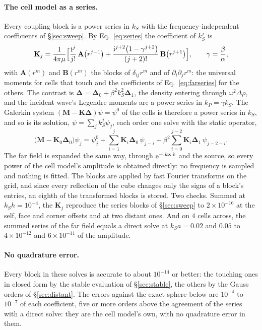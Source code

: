 \documentclass[11pt,a4paper]{article}
\newcommand{\bK}{\mathbf{K}}
\newcommand{\bD}{\boldsymbol{\Delta}}
\newcommand{\uvec}[1]{{\hat{\mathbf{#1}\mkern-3mu}\mkern3mu}}
\begin{document}
\paragraph{The cell model as a series.} Every coupling block is a power series in $k_S$ with the
frequency-independent coefficients of \S\ref{sec:sweep}. By Eq.~\eqref{eq:series} the coefficient of
$k_S^j$ is
\begin{equation}\label{eq:blockpowers}
  \bK_j=\frac1{4\pi\mu}\Bigl[\frac{\mathrm i^j}{j!}\,\mathbf A\bigl(r^{j-1}\bigr)
  +\frac{\mathrm i^{j+2}\bigl(1-\gamma^{j+2}\bigr)}{(j+2)!}\,\mathbf B\bigl(r^{j+1}\bigr)\Bigr],
  \qquad\gamma=\frac{\beta}{\alpha},
\end{equation}
with $\mathbf A(r^m)$ and $\mathbf B(r^m)$ the blocks of $\delta_{ij}r^m$ and of $\partial_i\partial_jr^m$: the
universal moments for cells that touch and the coefficients of Eq.~\eqref{eq:farseries} for the others. The
contrast is $\bD=\bD_0+\beta^2k_S^2\bD_1$, the density entering through $\omega^2\Delta\rho$, and the incident
wave's Legendre moments are a power series in $k_P=\gamma k_S$. The Galerkin system
$(\mathbf M-\bK\bD)\psi=\psi^0$ of the cells \citep{NestorLegendre2026} is therefore a power series in $k_S$,
and so is its solution, $\psi=\sum_jk_S^j\psi_j$, each order one solve with the static operator,
\begin{equation}\label{eq:seriessolve}
  \bigl(\mathbf M-\bK_0\bD_0\bigr)\psi_j=\psi^0_j+\sum_{i=1}^{j}\bK_i\bD_0\,\psi_{j-i}
  +\beta^2\sum_{i=0}^{j-2}\bK_i\bD_1\,\psi_{j-2-i}.
\end{equation}
The far field is expanded the same way, through $\mathrm e^{-\mathrm ik\mathbf x\cdot\uvec{r}}$ and the
source, so every power of the cell model's amplitude is obtained directly: no frequency is sampled and
nothing is fitted. The blocks are applied by fast
Fourier transforms on the grid, and since every reflection of the cube changes only the signs of a block's
entries, an eighth of the transformed blocks is stored. Two checks. Summed at $k_Sh=10^{-4}$, the
$\bK_j$ reproduce the series blocks of \S\ref{sec:sweep} to $2\times10^{-16}$ at the self, face and corner offsets and
at two distant ones. And on $4$ cells across, the summed series of the far field equals a direct solve at
$k_Sa=0.02$ and $0.05$ to $4\times10^{-12}$ and $6\times10^{-11}$ of the amplitude.

\paragraph{No quadrature error.} Every block in these solves is accurate to about $10^{-14}$ or better: the
touching ones in closed form by the stable evaluation of \S\ref{sec:stable}, the others by the Gauss orders of
\S\ref{sec:distant}. The errors against the exact sphere below are $10^{-4}$ to
$10^{-7}$ of each coefficient, five or more orders above the agreement of the series with a direct solve:
they are the cell model's own, with no quadrature error in them.
\end{document}
